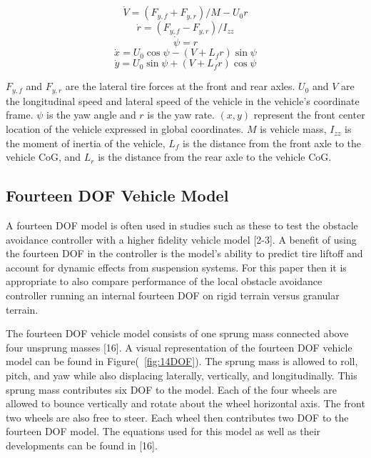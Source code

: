 \documentclass[12pt,twocolumn]{article}
\begin{document}
\begin{equation}\label{e:2DOF_Vdot}
\dot{V} = \left(F_{y,f} + F_{y,r}\right)/{M - U_0r} 
\end{equation}
\begin{equation}\label{e:2DOF_rdot}
\dot{r} = \left(F_{y,f} - F_{y,r}\right)/I_{zz}
\end{equation}
\begin{equation}\label{e:2DOF_psidot}
\dot{\psi} = r 
\end{equation}
\begin{equation}\label{e:2DOF_xdot}
\dot{x} = U_0\cos{\psi}-\left(V+L_fr\right)\sin{\psi}
\end{equation}
\begin{equation}\label{e:2DOF_ydot}
\dot{y} = U_0\sin{\psi}+\left(V+L_fr\right)\cos{\psi}
\end{equation}

$F_{y,f}$ and $F_{y,r}$ are the lateral tire forces at the front and rear axles. $U_0$ and $V$ are the longitudinal speed and lateral speed of the vehicle in the vehicle’s coordinate frame. $\psi$ is the yaw angle and $r$ is the yaw rate. $\left(x,y\right)$ represent the front center location of the vehicle expressed in global coordinates. $M$ is vehicle mass, $I_{zz}$ is the moment of inertia of the vehicle, $L_f$ is the distance from the front axle to the vehicle CoG, and $L_r$ is the distance from the rear axle to the vehicle CoG.




\subsection{Fourteen DOF Vehicle Model}\label{ss:14DOFModel}
A fourteen DOF model is often used in studies such as these to test the obstacle avoidance controller with a higher fidelity vehicle model [2-3]. A benefit of using the fourteen DOF in the controller is the model’s ability to predict tire liftoff and account for dynamic effects from suspension systems. For this paper then it is appropriate to also compare performance of the local obstacle avoidance controller running an internal fourteen DOF on rigid terrain versus granular terrain.  

The fourteen DOF vehicle model consists of one sprung mass connected above four unsprung masses [16]. A visual representation of the fourteen DOF vehicle model can be found in Figure(~\ref{fig:14DOF}). The sprung mass is allowed to roll, pitch, and yaw while also displacing laterally, vertically, and longitudinally. This sprung mass contributes six DOF to the model. Each of the four wheels are allowed to bounce vertically and rotate about the wheel horizontal axis. The front two wheels are also free to steer. Each wheel then contributes two DOF to the fourteen DOF model. The equations used for this model as well as their developments can be found in [16].
\end{document}
